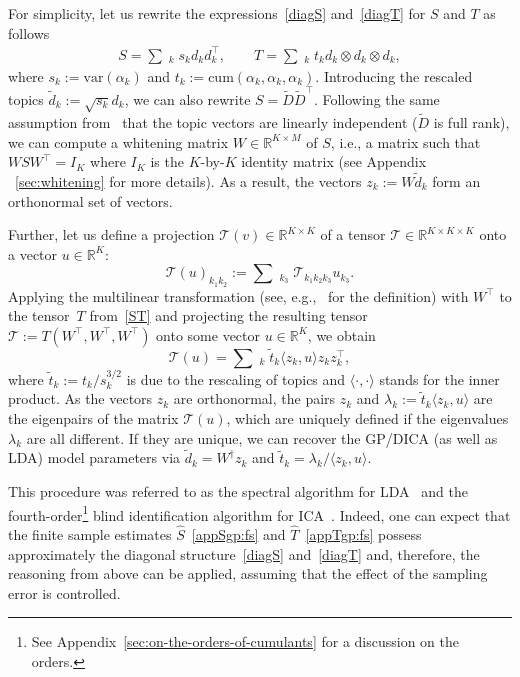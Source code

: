 \documentclass{article}
\newcommand{\innerp}[1]{\langle#1\rangle}
\newcommand{\wt}[1]{\widetilde{#1}}
\newcommand{\wh}[1]{\widehat{#1}}
\newcommand{\rr}[1]{\mathbb{R}^{#1}}
\newcommand{\pinv}{^{\dagger}}
\newcommand{\tp}{\otimes}
\newcommand{\ga}{\alpha}
\newcommand{\gl}{\lambda}
\newcommand{\tcal}{\mathcal{T}}
\newcommand{\var}{\mathrm{var}}
\newcommand{\cum}{\mathrm{cum}}
\begin{document}
For simplicity, let us rewrite the expressions~\eqref{diagS} and~\eqref{diagT} for $S$ and $T$ as follows
\begin{equation}  \label{ST}
\begin{aligned}
S  = \sum\mathop{}_{k} s_k d_k d_k^{\top}, \qquad
T  = \sum\mathop{}_{k} t_k d_k \tp d_k \tp d_k,
\end{aligned}
\end{equation}
where $s_k := \var(\ga_k)$ and $t_k := \cum(\ga_k,\ga_k,\ga_k)$.
Introducing the rescaled topics $\wt{d}_k :=  \sqrt{s_k} d_k$, we can also rewrite
$S = \wt{D} \wt{D}^{\top}$. Following the same assumption from~\cite{AnaEtAl2012} that the topic vectors are linearly independent ($\wt{D}$ is full rank), we can compute a whitening matrix $W\in\rr{K\times M}$ of $S$, i.e., a matrix such that $W S W^{\top} = I_{K}$ where $I_{K}$ is the $K$-by-$K$ identity matrix (see Appendix ~\ref{sec:whitening} for more details). As a result, the vectors $z_k := W\wt{d}_k$ form an orthonormal set of vectors.


Further, let us define a projection
 $\tcal(v)\in\rr{K\times K}$ of a tensor $\tcal\in\rr{K\times K\times K}$  onto a vector $u\in\rr{K}$:
\begin{equation}\label{projT}
\tcal(u)_{k_1 k_2} := \sum\mathop{}_{k_3} \tcal_{k_1k_2k_3} u_{k_3}.
\end{equation}
Applying the multilinear transformation (see, e.g.,~\cite{AnaEtAl2014} for the definition) with $W^{\top}$ to the tensor~$T$ from~\eqref{ST} and projecting the resulting tensor $\tcal :=T(W^{\top},W^{\top},W^{\top})$ onto some vector $u\in\rr{K}$, we obtain
\begin{equation}\label{orthT}
\tcal(u) = \sum\mathop{}_{k} \wt{t}_k \innerp{z_k,u} z_k z_k^{\top},
\end{equation}
where $\wt{t}_k := t_k / s_k^{3/2}$ is due to the rescaling of topics and $\innerp{\cdot,\cdot}$ stands for the inner product.  As the vectors $z_k$ are orthonormal, the pairs $z_k$ and $\gl_k :=\wt{t}_k\innerp{z_k,u}$ are the eigenpairs of the matrix $\tcal(u)$, which are uniquely defined if the eigenvalues $\gl_k$ are all different. If they are unique, we can recover the GP/DICA (as well as LDA) model parameters via $\wt{d}_k = W\pinv z_k$ and $\wt{t}_k = \gl_k / \innerp{z_k,u}$.


This procedure was referred to as
 the spectral algorithm for LDA~\cite{AnaEtAl2012} and the fourth-order\footnote{See Appendix~\ref{sec:on-the-orders-of-cumulants} for a discussion on the orders.}
blind identification algorithm for ICA~\cite{Car1989,Car1990}. Indeed, one can expect that the finite sample estimates
$\wh{S}$~\eqref{appSgp:fs} and $\wh{T}$~\eqref{appTgp:fs}
 possess approximately the diagonal structure~\eqref{diagS} and~\eqref{diagT} and, therefore, the reasoning from above can be applied, assuming that the effect of the sampling error is controlled.
\end{document}
